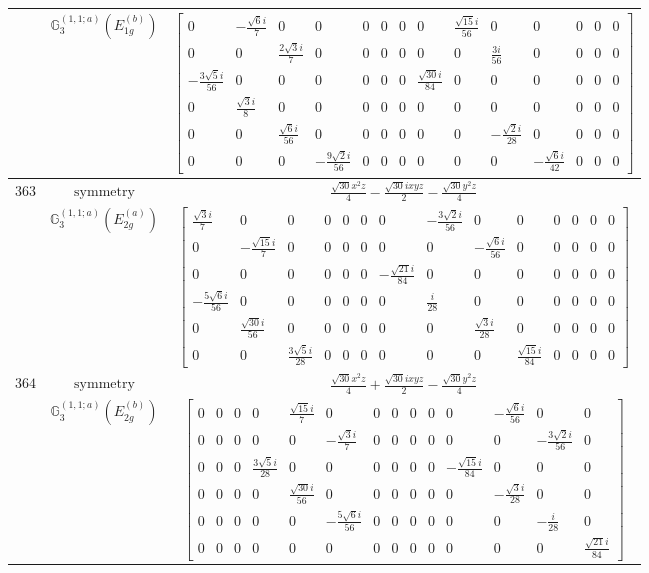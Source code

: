 \documentclass[fleqn,8pt,landscape]{jsarticle}
\begin{document}
\begin{longtable}{ccc}
$  $ & $ \mathbb{G}_{3}^{(1,1;a)}(E_{1g}^{(b)}) $ & $ \begin{bmatrix} 0 & - \frac{\sqrt{6} i}{7} & 0 & 0 & 0 & 0 & 0 & 0 & \frac{\sqrt{15} i}{56} & 0 & 0 & 0 & 0 & 0 \\ 0 & 0 & \frac{2 \sqrt{3} i}{7} & 0 & 0 & 0 & 0 & 0 & 0 & \frac{3 i}{56} & 0 & 0 & 0 & 0 \\ - \frac{3 \sqrt{5} i}{56} & 0 & 0 & 0 & 0 & 0 & 0 & \frac{\sqrt{30} i}{84} & 0 & 0 & 0 & 0 & 0 & 0 \\ 0 & \frac{\sqrt{3} i}{8} & 0 & 0 & 0 & 0 & 0 & 0 & 0 & 0 & 0 & 0 & 0 & 0 \\ 0 & 0 & \frac{\sqrt{6} i}{56} & 0 & 0 & 0 & 0 & 0 & 0 & - \frac{\sqrt{2} i}{28} & 0 & 0 & 0 & 0 \\ 0 & 0 & 0 & - \frac{9 \sqrt{2} i}{56} & 0 & 0 & 0 & 0 & 0 & 0 & - \frac{\sqrt{6} i}{42} & 0 & 0 & 0 \end{bmatrix} $ \\ \hline
$ 363 $ & $ \text{symmetry} $ & $ \frac{\sqrt{30} x^{2} z}{4} - \frac{\sqrt{30} i x y z}{2} - \frac{\sqrt{30} y^{2} z}{4} $ \\
$  $ & $ \mathbb{G}_{3}^{(1,1;a)}(E_{2g}^{(a)}) $ & $ \begin{bmatrix} \frac{\sqrt{3} i}{7} & 0 & 0 & 0 & 0 & 0 & 0 & - \frac{3 \sqrt{2} i}{56} & 0 & 0 & 0 & 0 & 0 & 0 \\ 0 & - \frac{\sqrt{15} i}{7} & 0 & 0 & 0 & 0 & 0 & 0 & - \frac{\sqrt{6} i}{56} & 0 & 0 & 0 & 0 & 0 \\ 0 & 0 & 0 & 0 & 0 & 0 & - \frac{\sqrt{21} i}{84} & 0 & 0 & 0 & 0 & 0 & 0 & 0 \\ - \frac{5 \sqrt{6} i}{56} & 0 & 0 & 0 & 0 & 0 & 0 & \frac{i}{28} & 0 & 0 & 0 & 0 & 0 & 0 \\ 0 & \frac{\sqrt{30} i}{56} & 0 & 0 & 0 & 0 & 0 & 0 & \frac{\sqrt{3} i}{28} & 0 & 0 & 0 & 0 & 0 \\ 0 & 0 & \frac{3 \sqrt{5} i}{28} & 0 & 0 & 0 & 0 & 0 & 0 & \frac{\sqrt{15} i}{84} & 0 & 0 & 0 & 0 \end{bmatrix} $ \\ \hline
$ 364 $ & $ \text{symmetry} $ & $ \frac{\sqrt{30} x^{2} z}{4} + \frac{\sqrt{30} i x y z}{2} - \frac{\sqrt{30} y^{2} z}{4} $ \\
$  $ & $ \mathbb{G}_{3}^{(1,1;a)}(E_{2g}^{(b)}) $ & $ \begin{bmatrix} 0 & 0 & 0 & 0 & \frac{\sqrt{15} i}{7} & 0 & 0 & 0 & 0 & 0 & 0 & - \frac{\sqrt{6} i}{56} & 0 & 0 \\ 0 & 0 & 0 & 0 & 0 & - \frac{\sqrt{3} i}{7} & 0 & 0 & 0 & 0 & 0 & 0 & - \frac{3 \sqrt{2} i}{56} & 0 \\ 0 & 0 & 0 & \frac{3 \sqrt{5} i}{28} & 0 & 0 & 0 & 0 & 0 & 0 & - \frac{\sqrt{15} i}{84} & 0 & 0 & 0 \\ 0 & 0 & 0 & 0 & \frac{\sqrt{30} i}{56} & 0 & 0 & 0 & 0 & 0 & 0 & - \frac{\sqrt{3} i}{28} & 0 & 0 \\ 0 & 0 & 0 & 0 & 0 & - \frac{5 \sqrt{6} i}{56} & 0 & 0 & 0 & 0 & 0 & 0 & - \frac{i}{28} & 0 \\ 0 & 0 & 0 & 0 & 0 & 0 & 0 & 0 & 0 & 0 & 0 & 0 & 0 & \frac{\sqrt{21} i}{84} \end{bmatrix} $ \\ \hline

\end{longtable}
\end{document}
